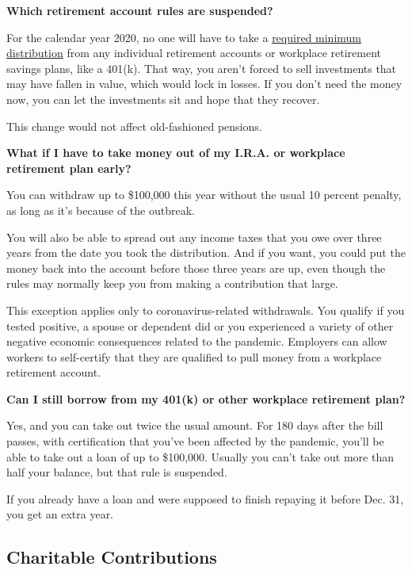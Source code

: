 \textbf{Which retirement account rules are suspended?}

For the calendar year 2020, no one will have to take a
\href{https://www.irs.gov/retirement-plans/plan-participant-employee/retirement-topics-required-minimum-distributions-rmds}{required
minimum distribution} from any individual retirement accounts or
workplace retirement savings plans, like a 401(k). That way, you aren't
forced to sell investments that may have fallen in value, which would
lock in losses. If you don't need the money now, you can let the
investments sit and hope that they recover.

This change would not affect old-fashioned pensions.

\textbf{What if I have to take money out of my I.R.A. or workplace
retirement plan early?}

You can withdraw up to \$100,000 this year without the usual 10 percent
penalty, as long as it's because of the outbreak.

You will also be able to spread out any income taxes that you owe over
three years from the date you took the distribution. And if you want,
you could put the money back into the account before those three years
are up, even though the rules may normally keep you from making a
contribution that large.

This exception applies only to coronavirus-related withdrawals. You
qualify if you tested positive, a spouse or dependent did or you
experienced a variety of other negative economic consequences related to
the pandemic. Employers can allow workers to self-certify that they are
qualified to pull money from a workplace retirement account.

\textbf{Can I still borrow from my 401(k) or other workplace retirement
plan?}

Yes, and you can take out twice the usual amount. For 180 days after the
bill passes, with certification that you've been affected by the
pandemic, you'll be able to take out a loan of up to \$100,000. Usually
you can't take out more than half your balance, but that rule is
suspended.

If you already have a loan and were supposed to finish repaying it
before Dec. 31, you get an extra year.

\hypertarget{charitable-contributions}{%
\subsection{Charitable Contributions}\label{charitable-contributions}}

